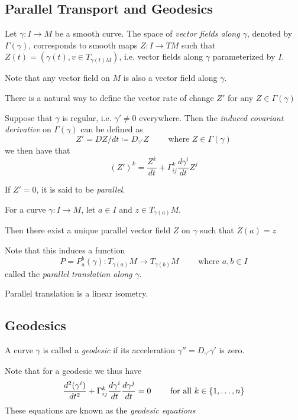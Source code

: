 \subsection{Parallel Transport and Geodesics}
\begin{definition}
Let $\gamma:I\to M$ be a smooth curve. The space of \emph{vector fields along $\gamma$}, denoted by $\Gamma(\gamma)$, corresponds to smooth maps $Z:I\to TM$ such that $Z(t) = (\gamma(t), v\in T_{\gamma(t)M})$, i.e. vector fields along $\gamma$ parameterized by $I$.
\end{definition}
Note that any vector field on $M$ is also a vector field along $\gamma$.

There is a natural way to define the vector rate of change $Z'$ for any $Z \in \Gamma(\gamma)$

\begin{definition}Suppose that $\gamma$ is regular, i.e. $\gamma'\neq0$ everywhere. Then the \emph{induced covariant derivative} on $\Gamma(\gamma)$ can be defined as
\[
Z' = DZ/dt \coloneqq D_{\gamma'}Z \qquad \text{ where } Z\in\Gamma(\gamma)
\]
we then have that 
\[
(Z')^k=\frac{Z^k}{dt}+\Gamma^k_{ij}\frac{d\gamma^i}{dt}Z^j
\]
\end{definition}
If $Z'=0$, it is said to be \emph{parallel}.
\begin{proposition} For a curve $\gamma:I\to M$, let $a\in I$ and $z \in T_{\gamma(a)}M$.

Then there exist a unique parallel vector field $Z$ on $\gamma$ such that $Z(a)=z$
\end{proposition}
Note that this induces a function 
\[
P = P^b_a(\gamma):T_{\gamma(a)}M\to T_{\gamma(b)}M \qquad \text{ where } a,b\in I
\]
called the \emph{parallel translation along $\gamma$}.
\begin{lemma}
Parallel translation is a linear isometry.
\end{lemma}

\subsection{Geodesics}
\begin{definition}[Geodesic]
A curve $\gamma$ is called a \emph{geodesic} if its acceleration $\gamma'' = D_{\gamma'}\gamma'$ is zero.
\end{definition}
Note that for a geodesic we thus have 
\begin{equation}\label{eq:geod}
\frac{d^2(\gamma^i)}{dt^2} + \Gamma^k_{ij}\frac{d\gamma^i}{dt}\frac{d\gamma^j}{dt} = 0 \qquad \text{ for all } k\in\{1,\dots,n\}
\end{equation}
These equations are known as the \emph{geodesic equations}

